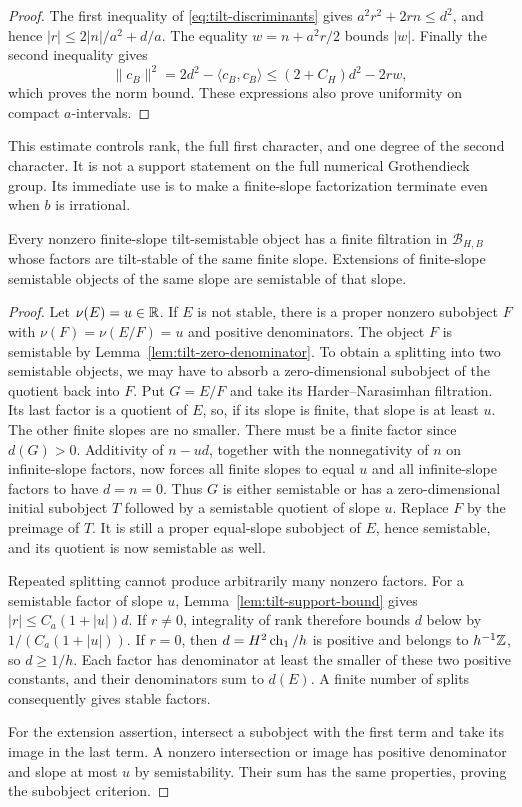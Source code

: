 \begin{proof}
The first inequality of \eqref{eq:tilt-discriminants} gives
$a^2r^2+2rn\le d^2$, and hence
$|r|\le 2|n|/a^2+d/a$.  The equality $w=n+a^2r/2$ bounds $|w|$.
Finally the second inequality gives
\[
 \|c_B\|^2=2d^2-\langle c_B,c_B\rangle
 \le(2+C_H)d^2-2rw,
\]
which proves the norm bound.  These expressions also prove uniformity
on compact $a$-intervals.
\end{proof}

This estimate controls rank, the full first character, and one degree
of the second character.  It is not a support statement on the full
numerical Grothendieck group.  Its immediate use is to make a
finite-slope factorization terminate even when $b$ is irrational.

\begin{lemma}\label{lem:finite-tilt-factors}
Every nonzero finite-slope tilt-semistable object has a finite
filtration in $\mathcal B_{H,B}$ whose factors are tilt-stable of the
same finite slope.  Extensions of finite-slope semistable objects of
the same slope are semistable of that slope.
\end{lemma}

\begin{proof}
Let $\nu(E)=u\in\mathbb R$.  If $E$ is not stable, there is a proper
nonzero subobject $F$ with $\nu(F)=\nu(E/F)=u$ and positive
denominators.  The object $F$ is semistable by
Lemma~\ref{lem:tilt-zero-denominator}.  To obtain a splitting into
two semistable objects, we may have to absorb a zero-dimensional
subobject of the quotient back into $F$.  Put $G=E/F$ and take its
Harder--Narasimhan filtration.  Its last factor is a quotient of $E$,
so, if its slope is finite, that slope is at least $u$.  The other
finite slopes are no smaller.  There must be a finite factor since
$d(G)>0$.  Additivity of $n-ud$, together with the nonnegativity of
$n$ on infinite-slope factors, now forces all finite slopes to equal
$u$ and all infinite-slope factors to have $d=n=0$.
Thus $G$ is either semistable or has a zero-dimensional initial
subobject $T$ followed by a semistable quotient of slope $u$.
Replace $F$ by the preimage of $T$.  It is still a proper
equal-slope subobject of $E$, hence semistable, and its quotient is
now semistable as well.

Repeated splitting cannot produce arbitrarily many nonzero factors.
For a semistable factor of slope $u$, Lemma~\ref{lem:tilt-support-bound}
gives $|r|\le C_a(1+|u|)d$.  If $r\ne0$, integrality of rank
therefore bounds $d$ below by $1/(C_a(1+|u|))$.
If $r=0$, then $d=H^2\operatorname{ch}_1/h$ is positive and belongs to
$h^{-1}\mathbb Z$, so $d\ge1/h$.  Each factor has denominator at least
the smaller of these two positive constants, and their denominators
sum to $d(E)$.  A finite number of splits consequently gives stable
factors.

For the extension assertion, intersect a subobject with the first
term and take its image in the last term.  A nonzero intersection or
image has positive denominator and slope at most $u$ by semistability.
Their sum has the same properties, proving the subobject criterion.
\end{proof}

